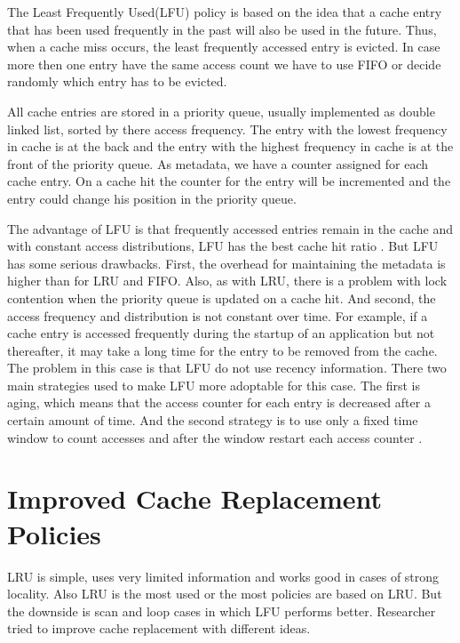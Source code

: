 \documentclass[
	12pt,
	a4paper,
	abstract,
	bibliography=totoc,
	chapterprefix,
	headings=openright,
	numbers=endperiod,
	parskip=half,
	twoside,
]{scrreprt}
\begin{document}
The Least Frequently Used(LFU) policy is based on the idea that a cache entry that has been used frequently in the past will also be used in the future.
Thus, when a cache miss occurs, the least frequently accessed entry is evicted.
In case more then one entry have the same access count we have to use FIFO or decide randomly which entry has to be evicted.

All cache entries are stored in a priority queue, usually implemented as double linked list, sorted by there access frequency.
The entry with the lowest frequency in cache is at the back and the entry with the highest frequency in cache is at the front of the priority queue.
As metadata, we have a counter assigned for each cache entry.
On a cache hit the counter for the entry will be incremented and the entry could change his position in the priority queue.

The advantage of LFU is that frequently accessed entries remain in the cache and with constant
access distributions, LFU has the best cache hit ratio \cite{einziger2017tinylfu}.
But LFU has some  serious drawbacks.
First, the overhead for maintaining the metadata is higher than for LRU and FIFO.
Also, as with LRU, there is a problem with lock contention when the priority queue is updated on a cache hit.
And second, the access frequency and distribution is not constant over time.
For example, if a cache entry is accessed frequently during the startup of an application but not thereafter, it may take a long time for the entry to be removed from the cache.
The problem in this case is that LFU do not use recency information.
There two main strategies used to make LFU more adoptable for this case.
The first is aging, which means that the access counter for each entry is decreased after  a certain amount of time.
And the second strategy is to use only a fixed time window to count accesses and after the window restart each access counter \cite{karakostas2000practical}.

\section{Improved Cache Replacement Policies}
LRU is simple, uses very limited information and works good in cases of strong locality.
Also LRU is the most used or the most policies are based on LRU.
But the downside is scan and loop cases in which LFU performs better.
Researcher tried to improve cache replacement with different ideas.
\end{document}
